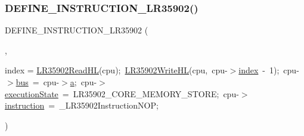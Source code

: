 \mbox{\label{isa-lr35902_8c_abb7d0e319cf64f6af2efa1c31aa140ae}} 
\subsubsection{\texorpdfstring{D\+E\+F\+I\+N\+E\+\_\+\+I\+N\+S\+T\+R\+U\+C\+T\+I\+O\+N\+\_\+\+L\+R35902()}{DEFINE\_INSTRUCTION\_LR35902()}\hspace{0.1cm}{\footnotesize\ttfamily [16/20]}}
{\footnotesize\ttfamily D\+E\+F\+I\+N\+E\+\_\+\+I\+N\+S\+T\+R\+U\+C\+T\+I\+O\+N\+\_\+\+L\+R35902 (\begin{DoxyParamCaption}\item[{L\+D\+D\+H\+LA}]{,  }\item[{cpu-\/$>$}]{index = {\ttfamily \mbox{\hyperlink{isa-lr35902_8c_a2aecac31902540d73a813542994471ff}{L\+R35902\+Read\+HL}}(cpu);~\mbox{\hyperlink{isa-lr35902_8c_a4e59a8175a58c35aba094ac7bb13fddd}{L\+R35902\+Write\+HL}}(cpu,~cpu-\/$>$\mbox{\hyperlink{isa-lr35902_8c_ac9ee548085af12859cb52a6c757cf73a}{index}}~-\/~1);~cpu-\/$>$\mbox{\hyperlink{isa-lr35902_8c_a6163e7e073b87ad067db0a3b10da6be9}{bus}}~=~cpu-\/$>$\mbox{\hyperlink{isa-lr35902_8c_a7015284d2957ab7cdf82d2535a2fa547}{a}};~cpu-\/$>$\mbox{\hyperlink{isa-lr35902_8c_a087a53d4d283226a73c530dd2883d634}{execution\+State}}~=~LR35902\+\_\+CORE\+\_\+MEMORY\+\_\+STORE;~cpu-\/$>$\mbox{\hyperlink{isa-lr35902_8c_a516462a0e821c76277faaeb2a1364b35}{instruction}}~=~\+\_\+LR35902InstructionNOP;} }\end{DoxyParamCaption})}

\mbox{\label{isa-lr35902_8c_a49ba58b8b96358823a5a4c7fd98605c5}} 
